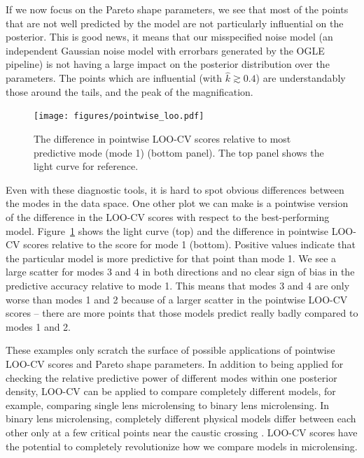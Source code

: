 \documentclass[12pt,dvipsnames]{report}
\begin{document}
If we now focus on the Pareto shape parameters, we see that most of the points 
that are not well predicted by the model are not particularly influential on the 
posterior. This is good news, it means that our misspecified noise model 
(an independent Gaussian noise model with errorbars generated by the OGLE pipeline)
is not having a large impact on the posterior distribution over the parameters.
The points which are influential (with $\hat k\gtrsim 0.4$) are understandably those 
around the tails, and the peak of the magnification. 

\begin{figure}[t]
    \begin{centering}
        \texttt{[image: figures/pointwise\_loo.pdf]}
        \caption{The difference in pointwise LOO-CV scores relative to most predictive 
        mode (mode 1) (bottom panel). The top panel shows the light curve for reference.}
            \label{fig:pointwise_loo}
    \end{centering}
\end{figure}

Even with these diagnostic tools, it is hard to spot obvious differences between the 
modes in the data space. One other plot we can make is a pointwise version of the 
difference in the LOO-CV scores with respect to the best-performing model.
Figure~\ref{fig:pointwise_loo} shows the light curve (top) and the difference in 
pointwise LOO-CV scores relative to the score for mode 1 (bottom). Positive values 
indicate that the particular model is more predictive for that point than mode 1. 
We see a large scatter for modes 3 and 4 in both directions and no clear sign 
of bias in the predictive accuracy relative to mode 1. This means that modes 
3 and 4 are only worse than modes 1 and 2 because of a larger scatter in the pointwise 
LOO-CV scores -- there are more points that those models predict really badly 
compared to modes 1 and 2.

These examples only scratch the surface of possible applications of pointwise 
LOO-CV scores and Pareto shape parameters.
In addition to being applied for checking the relative predictive power of 
different modes within one posterior density, LOO-CV can be applied to 
compare completely different models, for example, comparing single lens microlensing to 
binary lens microlensing. In binary lens microlensing, completely different 
physical models differ between each other only at a few critical points 
near the caustic crossing \citep[see for example Figure 1 in ][]{2018AJ....155..259H}. 
LOO-CV scores have the potential to completely revolutionize how we compare 
models in microlensing.
\end{document}

